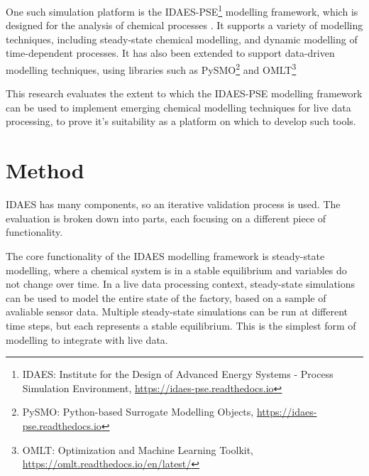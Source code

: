 \documentclass[12pt]{article}
\begin{document}
One such simulation platform is the IDAES-PSE\footnote{IDAES: Institute for the Design of Advanced Energy Systems - Process Simulation Environment, \href{https://idaes-pse.readthedocs.io}{https://idaes-pse.readthedocs.io}} modelling framework, which is designed for the analysis of chemical processes \cite{lee2021idaes}. It supports a variety of modelling techniques, including steady-state chemical modelling, and dynamic modelling of time-dependent processes. 
It has also been extended to support data-driven modelling techniques, using libraries such as PySMO\footnote{PySMO: Python-based Surrogate Modelling Objects, \href{https://idaes-pse.readthedocs.io/en/stable/explanations/modeling_extensions/surrogate/api/pysmo/index.html}{https://idaes-pse.readthedocs.io}} and OMLT\footnote{OMLT: Optimization and Machine Learning Toolkit, \href{https://omlt.readthedocs.io/en/latest/}{https://omlt.readthedocs.io/en/latest/}} \cite{cecconOMLTOptimizationMachine2022} 


This research evaluates the extent to which the IDAES-PSE modelling framework can be used to implement emerging chemical modelling techniques for live data processing, to prove it's suitability as a platform on which to develop such tools.

\section{Method}

IDAES has many components, so an iterative validation process is used. The evaluation is broken down into parts, each focusing on a different piece of functionality. 

The core functionality of the IDAES modelling framework is steady-state modelling, where a chemical system is in a stable equilibrium and variables do not change over time. In a live data processing context, steady-state simulations can be used to model the entire state of the factory, based on a sample of avaliable sensor data. Multiple steady-state simulations can be run at different time steps, but each represents a stable equilibrium. This is the simplest form of modelling to integrate with live data. 
\end{document}
